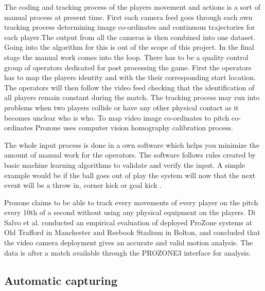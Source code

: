 The coding and tracking process of the players movement and actions is a sort of manual process at present time. First each camera feed goes through each own tracking process determining image co-ordinates and continuous trajectories for each player.The output from all the cameras is then combined into one dataset. Going into the algorithm for this is out of the scope of this project. In the final stage the manual work comes into the loop. There has to be a quality control group of operators dedicated for post processing the game. First the operators has to map the players identity and with the their corresponding start location. The operators will then follow the video feed checking that the identification of all players remain constant during the match. The tracking process may run into problems when two players collide or have any other physical contact as it becomes unclear who is who. To map video image co-ordinates to pitch co-ordinates Prozone uses computer vision homography calibration process.

The whole input process is done in a own software which helps you minimize the amount of manual work for the operators. The software follows rules created by basic machine learning algorithms to validate and verify the input. A simple example would be if the ball goes out of play the system will now that the next event will be a throw in, corner kick or goal kick \cite{Prozone:indepth}.

Prozone claims to be able to track every movements of every player on the pitch every 10th of a second without using any physical equipment on the players. Di Salvo et al. \cite{Prozone:validation} conducted an empirical evaluation of deployed ProZone systems at Old Trafford in Manchester and Reebook Stadium in Bolton, and concluded that the video camera deployment gives an accurate and valid motion analysis. The data is after a match available through the PROZONE3 interface for analysis. 

\subsection{Automatic capturing}

